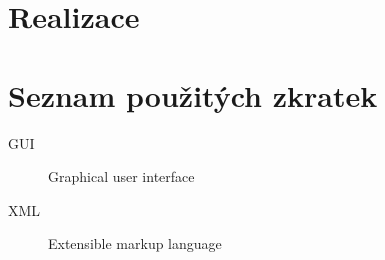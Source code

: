 \documentclass[thesis=B,czech]{FITthesis}[2012/06/26]
\begin{document}
\chapter{Realizace}


\begin{conclusion}
\end{conclusion}




\appendix


\chapter{Seznam použitých zkratek}
\begin{description}
	\item[GUI] Graphical user interface
	\item[XML] Extensible markup language
\end{description}
\end{document}
